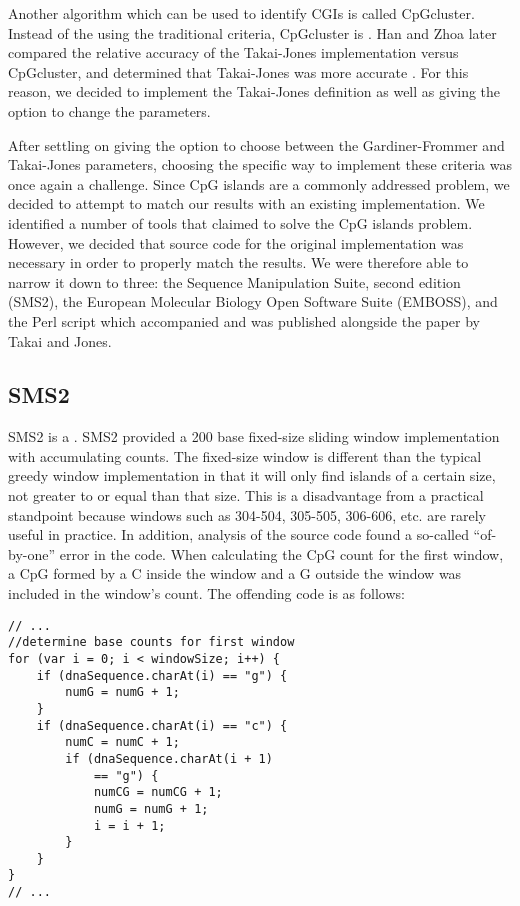 \documentclass{bioinfo}
\begin{document}
Another algorithm which can be used to identify CGIs is called
CpGcluster. Instead of the using the traditional criteria, CpGcluster
is . Han and Zhoa later
compared the relative accuracy of the Takai-Jones implementation
versus CpGcluster, and determined that Takai-Jones was more accurate
\citep{pmid19232104}. For this reason, we decided to implement the
Takai-Jones definition as well as giving the option to change the
parameters.

After settling on giving the option to choose between the
Gardiner-Frommer and Takai-Jones parameters, choosing the specific way
to implement these criteria was once again a challenge. Since CpG
islands are a commonly addressed problem, we decided to attempt to
match our results with an existing implementation. We identified a
number of tools that claimed to solve the CpG islands
problem. However, we decided that source code for the original
implementation was necessary in order to properly match the
results. We were therefore able to narrow it down to three: the
Sequence Manipulation Suite, second edition (SMS2), the European
Molecular Biology Open Software Suite (EMBOSS), and the Perl script
which accompanied and was published alongside the paper by Takai and
Jones.

\subsection{SMS2}

SMS2 is a . SMS2 provided a 200 base fixed-size sliding window
implementation with accumulating counts. The fixed-size window is
different than the typical greedy window implementation in that it
will only find islands of a certain size, not greater to or equal than
that size. This is a disadvantage from a practical standpoint because
windows such as 304-504, 305-505, 306-606, etc. are rarely useful in
practice. In addition, analysis of the source code found a so-called
``of-by-one'' error in the code. When calculating the CpG count for
the first window, a CpG formed by a C inside the window and a G
outside the window was included in the window's count. The offending
code is as follows:
\pagebreak
\begin{verbatim}
// ...
//determine base counts for first window
for (var i = 0; i < windowSize; i++) {
    if (dnaSequence.charAt(i) == "g") {
        numG = numG + 1;
    }
    if (dnaSequence.charAt(i) == "c") {
        numC = numC + 1;
        if (dnaSequence.charAt(i + 1)
            == "g") {
            numCG = numCG + 1;
            numG = numG + 1;
            i = i + 1;
        }
    }
}
// ...
\end{verbatim}
\end{document}
